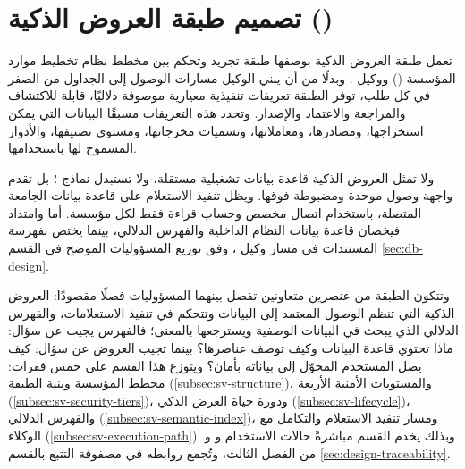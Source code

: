 \section{تصميم طبقة العروض الذكية ()}
\label{sec:smart-views-design}

تعمل طبقة العروض الذكية بوصفها طبقة تجريد وتحكم بين مخطط نظام تخطيط موارد المؤسسة () ووكيل . وبدلًا من أن يبني الوكيل مسارات الوصول إلى الجداول من الصفر في كل طلب، توفر الطبقة تعريفات تنفيذية معيارية موصوفة دلاليًا، قابلة للاكتشاف والمراجعة والاعتماد والإصدار. وتحدد هذه التعريفات مسبقًا البيانات التي يمكن استخراجها، ومصادرها، ومعاملاتها، وتسميات مخرجاتها، ومستوى تصنيفها، والأدوار المسموح لها باستخدامها.

ولا تمثل العروض الذكية قاعدة بيانات تشغيلية مستقلة، ولا تستبدل نماذج ؛ بل تقدم واجهة وصول موحدة ومضبوطة فوقها. ويظل تنفيذ الاستعلام على قاعدة بيانات الجامعة المتصلة، باستخدام اتصال مخصص وحساب قراءة فقط لكل مؤسسة. أما  وامتداد  فيخصان قاعدة بيانات النظام الداخلية والفهرس الدلالي، بينما يختص  \cite{qdrant2024} بفهرسة المستندات في مسار وكيل ، وفق توزيع المسؤوليات الموضح في القسم \ref{sec:db-design}.

وتتكون الطبقة من عنصرين متعاونين تفصل بينهما المسؤوليات فصلًا مقصودًا: العروض الذكية التي تنظم الوصول المعتمد إلى البيانات وتتحكم في تنفيذ الاستعلامات، والفهرس الدلالي الذي يبحث في البيانات الوصفية ويسترجعها بالمعنى؛ فالفهرس يجيب عن سؤال: ماذا تحتوي قاعدة البيانات وكيف توصف عناصرها؟ بينما تجيب العروض عن سؤال: كيف يصل المستخدم المخوّل إلى بياناته بأمان؟ ويتوزع هذا القسم على خمس فقرات: مخطط المؤسسة وبنية الطبقة (\ref{subsec:sv-structure})، والمستويات الأمنية الأربعة (\ref{subsec:sv-security-tiers})، ودورة حياة العرض الذكي (\ref{subsec:sv-lifecycle})، والفهرس الدلالي (\ref{subsec:sv-semantic-index})، ومسار تنفيذ الاستعلام والتكامل مع الوكلاء (\ref{subsec:sv-execution-path}). وبذلك يخدم القسم مباشرةً حالات الاستخدام  و و من الفصل الثالث، وتُجمع روابطه في مصفوفة التتبع بالقسم \ref{sec:design-traceability}.

